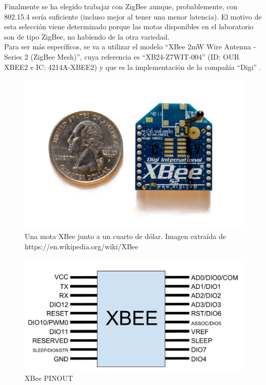 Finalmente se ha elegido trabajar con ZigBee aunque, probablemente, con 802.15.4 sería suficiente (incluso
mejor al tener una menor latencia). El motivo de esta selección viene determinado porque las motas disponibles
en el laboratorio son de tipo ZigBee, no habiendo de la otra variedad.\\

Para ser más específicos, se va a utilizar el modelo “XBee 2mW Wire Antenna - Series 2 (ZigBee Mesh)”, cuya referencia es
“XB24-Z7WIT-004” (ID: OUR XBEE2 e IC: 4214A-XBEE2) y que es la implementación de la compañía “Digi” \cite{productdetaildigi}.


\begin{figure}[htb]
\centering
\includegraphics[width=1\textwidth]{./imagenes/xbeequarter}
\caption{Una mota XBee junto a un cuarto de dólar. Imagen extraída de \scriptsize{https://en.wikipedia.org/wiki/XBee} } \label{fig:xbeequarter}
\end{figure}

\begin{figure}[htb]
\centering
\includegraphics[width=1\textwidth]{./imagenes/xbeepinout}
\caption{XBee PINOUT} \label{fig:xbeepinout}
\end{figure}

